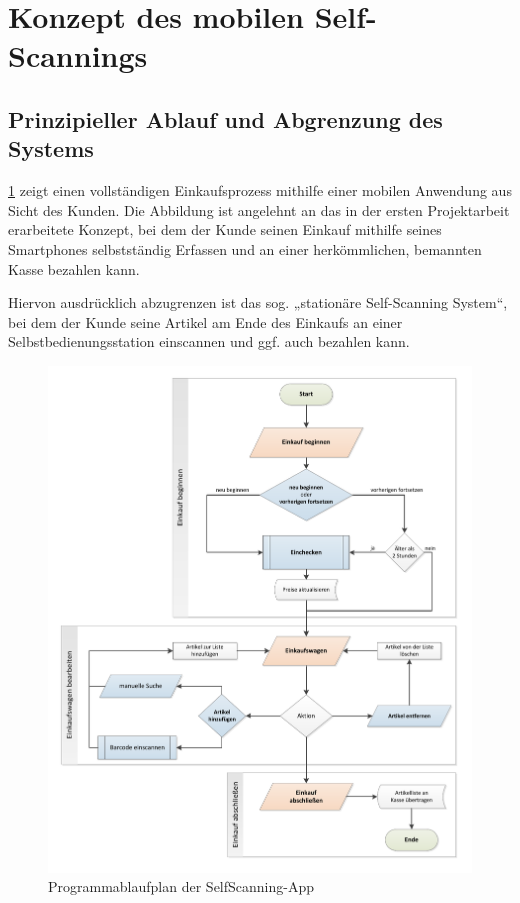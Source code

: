 \section{Konzept des mobilen Self-Scannings}
\subsection{Prinzipieller Ablauf und Abgrenzung des Systems}
\ref{abb:gesamtkonzept} zeigt einen vollständigen Einkaufsprozess mithilfe einer mobilen Anwendung aus Sicht des Kunden. Die Abbildung ist angelehnt an das in der ersten Projektarbeit erarbeitete Konzept, bei dem der Kunde seinen Einkauf mithilfe seines Smartphones selbstständig Erfassen und an einer herkömmlichen, bemannten Kasse bezahlen kann. 

Hiervon ausdrücklich abzugrenzen ist das sog. „stationäre Self-Scanning System“, bei dem der Kunde seine Artikel am Ende des Einkaufs an einer Selbstbedienungsstation einscannen und ggf. auch bezahlen kann.

\begin{figure}[H]
\includegraphics[width=\linewidth]{res/ablaufdiagramm_v2.pdf}
\caption{Programmablaufplan der SelfScanning-App}\label{abb:gesamtkonzept}
\end{figure}

